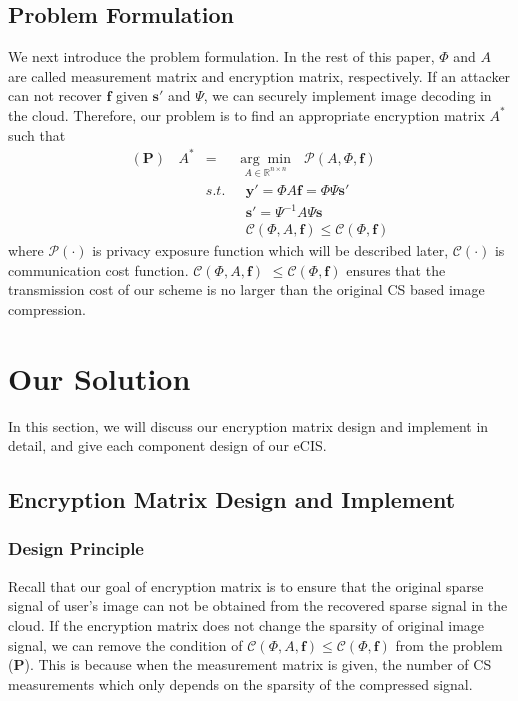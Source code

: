 \documentclass[conference]{IEEEtran}
\begin{document}
\subsection{Problem Formulation}
We next introduce the problem formulation. In the rest of this paper, $\Phi$ and $A$ are called measurement matrix and encryption matrix, respectively. If an attacker can not recover $\mathbf{f}$ given $\mathbf{s}'$ and $\Psi$, we can securely implement image decoding in the cloud. Therefore, our problem is to find an appropriate encryption matrix $A^*$ such that
\begin{eqnarray*}\label{e_obj_fun}
\mathbf{(P)}~~~~  A^* & = &  \underset{A\in\mathbb{R}^{n\times n}}{\arg\min}~~~\mathcal{P}\left(A,\Phi,\mathbf{f}\right)  \\
   & s.t.& ~~~\mathbf{y}'=\Phi A\mathbf{f}=\Phi \Psi \mathbf{s}'  \\
   & &     ~~~\mathbf{s}'=\Psi^{-1}A\Psi \mathbf{s}  \\
   & &     ~~~\mathcal{C}(\Phi, A, \mathbf{f})\leq \mathcal{C}(\Phi, \mathbf{f})
\end{eqnarray*}
where $\mathcal{P}(\cdot)$ is privacy exposure function which will be described later, $\mathcal{C}(\cdot)$ is communication cost function. $\mathcal{C}(\Phi, A, \mathbf{f})$ $\leq  \mathcal{C}(\Phi, \mathbf{f})$ ensures  that the transmission cost of our scheme is no larger than the original CS based image compression. 
\section{Our Solution}
In this section, we will discuss our encryption matrix design and implement in detail, and give each component design of our eCIS.
\subsection{Encryption Matrix Design and Implement}
\subsubsection{Design Principle}Recall that our goal of encryption matrix is to ensure that the original sparse signal of user's image can not be obtained from the recovered sparse signal in the cloud. If the encryption matrix does not change the sparsity of original image signal, we can remove the condition of $\mathcal{C}(\Phi, A, \mathbf{f})\leq \mathcal{C}(\Phi, \mathbf{f})$ from the problem (\textbf{P}). This is because when the measurement matrix is given, the number of CS measurements which  only depends on the sparsity of the compressed signal.
\end{document}
